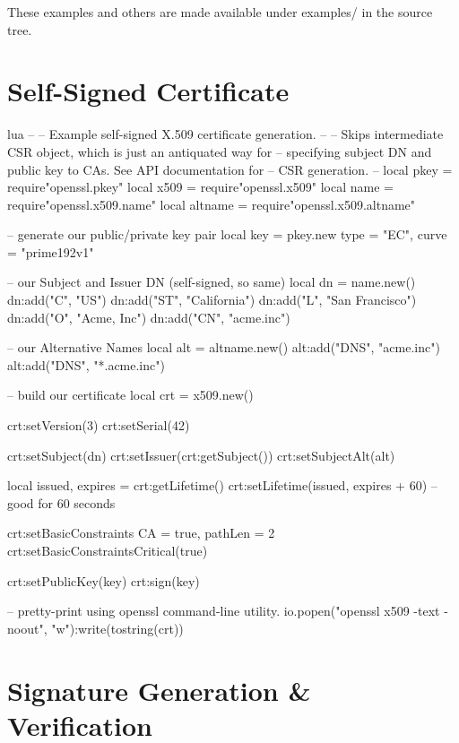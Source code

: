 \documentclass[11pt, oneside]{memoir}
\begin{document}
These examples and others are made available under examples/ in the source tree.

\section{Self-Signed Certificate}

\begin{example}{lua}
--
-- Example self-signed X.509 certificate generation.
--
-- Skips intermediate CSR object, which is just an antiquated way for
-- specifying subject DN and public key to CAs. See API documentation for
-- CSR generation.
--
local pkey = require"openssl.pkey"
local x509 = require"openssl.x509"
local name = require"openssl.x509.name"
local altname = require"openssl.x509.altname"

-- generate our public/private key pair
local key = pkey.new{ type = "EC", curve = "prime192v1" }

-- our Subject and Issuer DN (self-signed, so same)
local dn = name.new()
dn:add("C", "US")
dn:add("ST", "California")
dn:add("L", "San Francisco")
dn:add("O", "Acme, Inc")
dn:add("CN", "acme.inc")

-- our Alternative Names
local alt = altname.new()
alt:add("DNS", "acme.inc")
alt:add("DNS", "*.acme.inc")

-- build our certificate
local crt = x509.new()

crt:setVersion(3)
crt:setSerial(42)

crt:setSubject(dn)
crt:setIssuer(crt:getSubject())
crt:setSubjectAlt(alt)

local issued, expires = crt:getLifetime()
crt:setLifetime(issued, expires + 60) -- good for 60 seconds

crt:setBasicConstraints{ CA = true, pathLen = 2 }
crt:setBasicConstraintsCritical(true)

crt:setPublicKey(key)
crt:sign(key)

-- pretty-print using openssl command-line utility.
io.popen("openssl x509 -text -noout", "w"):write(tostring(crt))


\end{example}


\clearpage

\section{Signature Generation \& Verification}
\end{document}
